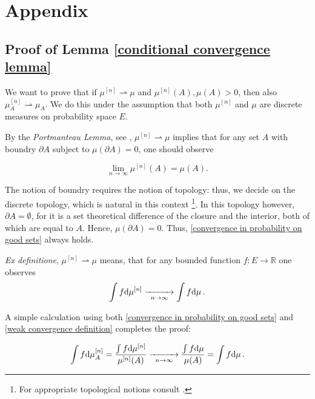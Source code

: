 \section*{Appendix}

\subsection*{Proof of Lemma \ref{conditional convergence lemma}}

We want to prove that if $\mu^{[n]} \rightharpoonup \mu$ and $\mu^{[n]}(A), \mu(A) > 0$, then also $\mu^{[n]}_A \rightharpoonup \mu_A$. We do this under the assumption that both $\mu^{[n]}$ and $\mu$ are discrete measures on probability space $E$. 

By the {\it Portmanteau Lemma}, see \cite{Kallenberg2002FoundationsOfModernProbability}, $\mu^{[n]} \rightharpoonup \mu$ implies that for any set $A$ with boundry $\partial A$ subject to $\mu( \partial A) = 0$, one should observe 

\begin{equation}\label{convergence in probability on good sets}
	\lim_{n \to \infty} \mu^{[n]}(A) = \mu(A).
\end{equation}


The notion of boundry requires the notion of topology: thus, we decide on the discrete topology, which is natural in this context \footnote{For appropriate topological notions consult \cite{Dugundji1966Topology}.}. In this topology however, $\partial A = \emptyset$, for it is a set theoretical difference of the closure and the interior, both of which are equal to $A$. Hence, $\mu( \partial A) = 0$. Thus, \eqref{convergence in probability on good sets} always holds.

{\it Ex definitione}, $\mu^{[n]} \rightharpoonup \mu$ means, that for any bounded function $f:E\to\mathbb{R}$ one observes
\begin{equation}\label{weak convergence definition}
	\int f \mathrm{d} \mu^{[n]} \underset{n \to \infty}{\xrightarrow{\hspace*{1cm}}} \int f \mathrm{d}\mu\,.
\end{equation}

A simple calculation using both \eqref{convergence in probability on good sets} and \eqref{weak convergence definition} completes the proof:

\begin{equation*}
	\int f \mathrm{d} \mu^{[n]}_A =  \frac{ \int f \mathrm{d} \mu^{[n]} }{ \mu^{[n]}(A) } \underset{n \to \infty}{\xrightarrow{\hspace*{1cm}}} \frac{ \int f \mathrm{d} \mu }{ \mu(A) } = \int f \mathrm{d} \mu\,.
\end{equation*}

